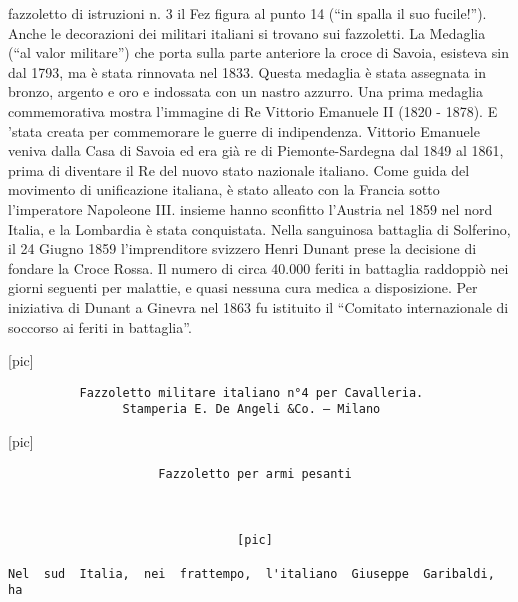 fazzoletto di istruzioni n. 3 il Fez figura al punto 14 (``in spalla il
suo fucile!''). Anche le decorazioni dei militari italiani si trovano
sui fazzoletti. La Medaglia (``al valor militare'') che porta sulla
parte anteriore la croce di Savoia, esisteva sin dal 1793, ma è stata
rinnovata nel 1833. Questa medaglia è stata assegnata in bronzo, argento
e oro e indossata con un nastro azzurro. Una prima medaglia
commemorativa mostra l'immagine di Re Vittorio Emanuele II (1820 -
1878). E 'stata creata per commemorare le guerre di indipendenza.
Vittorio Emanuele veniva dalla Casa di Savoia ed era già re di
Piemonte-Sardegna dal 1849 al 1861, prima di diventare il Re del nuovo
stato nazionale italiano. Come guida del movimento di unificazione
italiana, è stato alleato con la Francia sotto l'imperatore Napoleone
III. insieme hanno sconfitto l'Austria nel 1859 nel nord Italia, e la
Lombardia è stata conquistata. Nella sanguinosa battaglia di Solferino,
il 24 Giugno 1859 l'imprenditore svizzero Henri Dunant prese la
decisione di fondare la Croce Rossa. Il numero di circa 40.000 feriti in
battaglia raddoppiò nei giorni seguenti per malattie, e quasi nessuna
cura medica a disposizione. Per iniziativa di Dunant a Ginevra nel 1863
fu istituito il ``Comitato internazionale di soccorso ai feriti in
battaglia''.

{[}pic{]}

\begin{verbatim}
          Fazzoletto militare italiano n°4 per Cavalleria.
                Stamperia E. De Angeli &Co. – Milano
\end{verbatim}

{[}pic{]}

\begin{verbatim}
                     Fazzoletto per armi pesanti



                                [pic]

Nel  sud  Italia,  nei  frattempo,  l'italiano  Giuseppe  Garibaldi,  ha
\end{verbatim}

